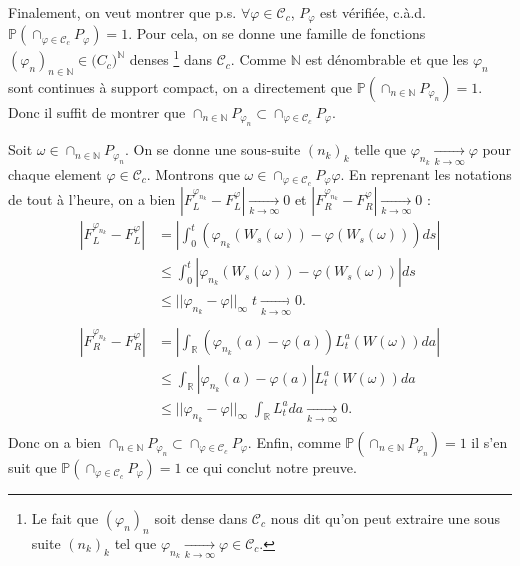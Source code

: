 \documentclass[openany]{book}
\makeatletter
\renewcommand{\P}{\mathds{P}}
\newcommand{\R}{\mathbb{R}}
\newcommand{\1}{\mathbbm{1}}
\renewenvironment{proof}[1][\textbf{\textit{Démonstration}}]{%
  \par\pushQED{\qed}%
  \normalfont\topsep6\p@\@plus6\p@\relax
  \trivlist\item[\hskip\labelsep
    #1\@addpunct{.}]\ignorespaces
}{%
  \popQED\endtrivlist\@endpefalse
}
\theoremstyle{thmfont}
\theoremstyle{deffont}
\theoremstyle{thmfont}
\theoremstyle{deffont}
\makeatother
\begin{document}
\begin{proof}
    Finalement, on veut montrer que p.s. $\forall \varphi \in \mathcal C_c$, $P_\varphi$ est vérifiée, c.à.d. $\P(\cap_{\varphi \in \mathcal C_c} P_\varphi) = 1$. Pour cela, on se donne une famille de fonctions $(\varphi_n)_{n\in \mathbb N} \in \mathcal (C_c)^{\mathbb N}$ denses
 \footnote{Le fait que $(\varphi_n)_n$ soit dense dans $\mathcal C_c$ nous dit qu'on peut extraire une sous suite $(n_k)_k$ tel que $\varphi_{n_k} \xrightarrow[k \to \infty]{} \varphi \in \mathcal C_c$.}
 dans $\mathcal C_c$. Comme $\mathbb N$ est dénombrable et que les $\varphi_n$ sont continues à support compact, on a directement que $\P(\cap_{n\in \mathbb N}P_{\varphi_n})=1$. Donc il suffit de montrer que $\cap_{n\in \mathbb N} P_{\varphi_n} \subset \cap_{\varphi \in \mathcal C_c} P_\varphi$.

  Soit $\omega \in \cap_{n\in \mathbb N}P_{\varphi_n}$. On se donne une sous-suite $(n_k)_k$ telle que $\varphi_{n_k} \xrightarrow[k \to \infty]{} \varphi$ pour chaque element $\varphi \in \mathcal C_c$. Montrons que $\omega \in \cap_{\varphi \in \mathcal C_c} P_\varphi\varphi$. En reprenant les notations de tout à l'heure, on a bien $|F_L^{\varphi_{n_k}} - F_L^\varphi|\xrightarrow[k \to \infty]{} 0$ et $|F_R^{\varphi_{n_k}} - F_R^\varphi|\xrightarrow[k \to \infty]{} 0$ :
%
\begin{align*}
  |F_L^{\varphi_{n_k}} - F_L^\varphi| &= \left|\int_0^t \left( \varphi_{n_k}(W_s(\omega)) - \varphi(W_s(\omega))\right)ds\right|\\
                        &\leq \int_0^t \left| \varphi_{n_k}(W_s(\omega)) - \varphi(W_s(\omega))\right|ds\\
                        &\leq ||\varphi_{n_k} - \varphi||_{\infty} \;t \xrightarrow[k \to \infty]{} 0.\\
  \\
  |F_R^{\varphi_{n_k}} - F_R^\varphi| &= \left|\int_\R \left( \varphi_{n_k}(a) - \varphi(a)\right) L_t^a(W(\omega)) da\right|\\
                          &\leq \int_\R |\varphi_{n_k}(a) - \varphi(a)| L_t^a(W(\omega)) da\\
                          &\leq ||\varphi_{n_k} - \varphi||_\infty \; \int_\R L_t^a da \xrightarrow[k\to \infty]{} 0.\\
\end{align*}
Donc on a bien $\cap_{n\in \mathbb N} P_{\varphi_n} \subset \cap_{\varphi \in \mathcal C_c} P_\varphi$. Enfin, comme $\P(\cap_{n\in \mathbb N} P_{\varphi_n}) = 1$ il s'en suit que $\P(\cap_{\varphi \in \mathcal C_c} P_\varphi) = 1$ ce qui conclut notre preuve.

  \end{proof}
\end{document}
